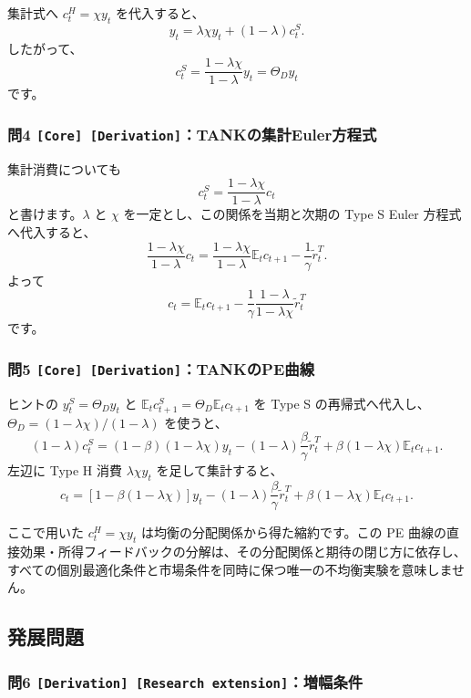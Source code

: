 \documentclass[
  japanese,
  lualatex,
  ja=standard,
  11pt,
  a4paper]{ltjsarticle}
\begin{document}
集計式へ \(c_t^H=\chi y_t\) を代入すると、 \[
y_t=\lambda\chi y_t+(1-\lambda)c_t^S.
\] したがって、 \[
c_t^S=\frac{1-\lambda\chi}{1-\lambda}y_t
=\Theta_Dy_t
\] です。

\subsubsection{\texorpdfstring{問4
\texttt{{[}Core{]}\ {[}Derivation{]}}：TANKの集計Euler方程式}{問4 {[}Core{]} {[}Derivation{]}：TANKの集計Euler方程式}}\label{ux554f4-core-derivationtankux306eux96c6ux8a08eulerux65b9ux7a0bux5f0f}

集計消費についても \[
c_t^S=\frac{1-\lambda\chi}{1-\lambda}c_t
\] と書けます。\(\lambda\) と \(\chi\)
を一定とし、この関係を当期と次期の Type S Euler 方程式へ代入すると、 \[
\frac{1-\lambda\chi}{1-\lambda}c_t
=\frac{1-\lambda\chi}{1-\lambda}\mathbb E_tc_{t+1}
-\frac1\gamma\widetilde r_t^T.
\] よって \[
c_t=\mathbb E_tc_{t+1}
-\frac1\gamma\frac{1-\lambda}{1-\lambda\chi}
\widetilde r_t^T
\] です。

\subsubsection{\texorpdfstring{問5
\texttt{{[}Core{]}\ {[}Derivation{]}}：TANKのPE曲線}{問5 {[}Core{]} {[}Derivation{]}：TANKのPE曲線}}\label{ux554f5-core-derivationtankux306epeux66f2ux7dda}

ヒントの \(y_t^S=\Theta_Dy_t\) と
\(\mathbb E_tc_{t+1}^S=\Theta_D\mathbb E_tc_{t+1}\) を Type S
の再帰式へ代入し、\(\Theta_D=(1-\lambda\chi)/(1-\lambda)\) を使うと、 \[
(1-\lambda)c_t^S
=(1-\beta)(1-\lambda\chi)y_t
-(1-\lambda)\frac\beta\gamma\widetilde r_t^T
+\beta(1-\lambda\chi)\mathbb E_tc_{t+1}.
\] 左辺に Type H 消費 \(\lambda\chi y_t\) を足して集計すると、 \[
c_t
=\left[1-\beta(1-\lambda\chi)\right]y_t
-(1-\lambda)\frac\beta\gamma\widetilde r_t^T
+\beta(1-\lambda\chi)\mathbb E_tc_{t+1}.
\]

ここで用いた \(c_t^H=\chi y_t\) は均衡の分配関係から得た縮約です。この
PE
曲線の直接効果・所得フィードバックの分解は、その分配関係と期待の閉じ方に依存し、すべての個別最適化条件と市場条件を同時に保つ唯一の不均衡実験を意味しません。

\subsection{発展問題}\label{ux767aux5c55ux554fux984c-11}

\subsubsection{\texorpdfstring{問6
\texttt{{[}Derivation{]}\ {[}Research\ extension{]}}：増幅条件}{問6 {[}Derivation{]} {[}Research extension{]}：増幅条件}}\label{ux554f6-derivation-research-extensionux5897ux5e45ux6761ux4ef6}
\end{document}
